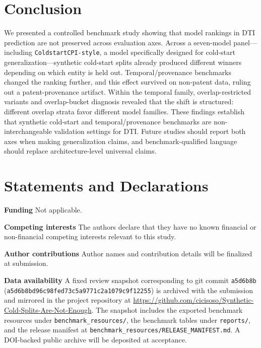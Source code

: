 \documentclass[referee,pdflatex,sn-basic,Numbered]{sn-jnl}
\begin{document}
\section{Conclusion}
\label{sec:conclusion}

We presented a controlled benchmark study showing that model rankings in DTI prediction are not preserved across evaluation axes. Across a seven-model panel—including \texttt{ColdstartCPI-style}, a model specifically designed for cold-start generalization—synthetic cold-start splits already produced different winners depending on which entity is held out. Temporal/provenance benchmarks changed the ranking further, and this effect survived on non-patent data, ruling out a patent-provenance artifact. Within the temporal family, overlap-restricted variants and overlap-bucket diagnosis revealed that the shift is structured: different overlap strata favor different model families. These findings establish that synthetic cold-start and temporal/provenance benchmarks are non-interchangeable validation settings for DTI. Future studies should report both axes when making generalization claims, and benchmark-qualified language should replace architecture-level universal claims.

\backmatter

\section*{Statements and Declarations}

\textbf{Funding} Not applicable.

\textbf{Competing interests} The authors declare that they have no known financial or non-financial competing interests relevant to this study.

\textbf{Author contributions} Author names and contribution details will be finalized at submission.

\textbf{Data availability} A fixed review snapshot corresponding to git commit \texttt{a5d6b8b} (\texttt{a5d6b8bd96c98fed73c5a9771c2a1079c9f12255}) is archived with the submission and mirrored in the project repository at \url{https://github.com/cicisoso/Synthetic-Cold-Splits-Are-Not-Enough}. The snapshot includes the exported benchmark resources under \texttt{benchmark\_resources/}, the benchmark tables under \texttt{reports/}, and the release manifest at \texttt{benchmark\_resources/RELEASE\_MANIFEST.md}. A DOI-backed public archive will be deposited at acceptance.
\end{document}
